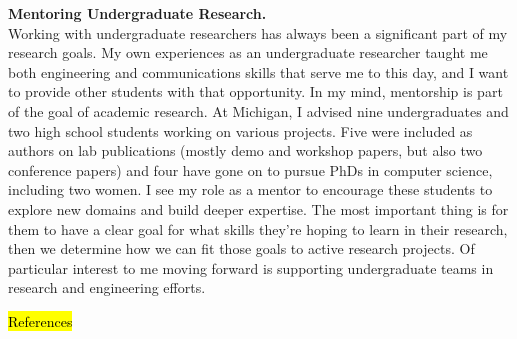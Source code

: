 \documentclass[11pt]{article} %
\begin{document}
\textbf{\textsf{\large Mentoring Undergraduate Research.}}\\
Working with undergraduate researchers has always been a significant part of my
research goals. My own experiences as an undergraduate researcher taught me
both engineering and communications skills that serve me to this day, and I
want to provide other students with that opportunity. In my mind, mentorship is
part of the goal of academic research. At Michigan, I advised nine
undergraduates and two high school students working on various projects. Five
were included as authors on lab publications (mostly demo and workshop papers,
but also two conference papers) and four have gone on to pursue PhDs in
computer science, including two women. I see my role as a mentor to encourage
these students to explore new domains and build deeper expertise. The most
important thing is for them to have a clear goal for what skills they're hoping
to learn in their research, then we determine how we can fit those goals to
active research projects. Of particular interest to me moving forward is
supporting undergraduate teams in research and engineering efforts.

\hl{References}
\end{document}
